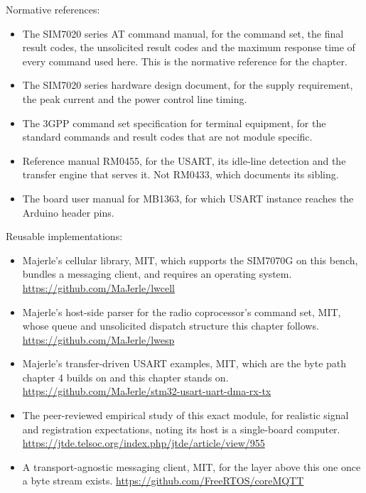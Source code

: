 Normative references:
\begin{itemize}
\item The SIM7020 series AT command manual, for the command set, the final
result codes, the unsolicited result codes and the maximum response time of
every command used here. This is the normative reference for the chapter.
\item The SIM7020 series hardware design document, for the supply requirement,
the peak current and the power control line timing.
\item The 3GPP command set specification for terminal equipment, for the
standard commands and result codes that are not module specific.
\item Reference manual RM0455, for the USART, its idle-line detection and the
transfer engine that serves it. Not RM0433, which documents its sibling.
\item The board user manual for MB1363, for which USART instance reaches the
Arduino header pins.
\end{itemize}

Reusable implementations:
\begin{itemize}
\item Majerle's cellular library, MIT, which supports the SIM7070G on this
bench, bundles a messaging client, and requires an operating system.\newline
\url{https://github.com/MaJerle/lwcell}
\item Majerle's host-side parser for the radio coprocessor's command set, MIT,
whose queue and unsolicited dispatch structure this chapter follows.\newline
\url{https://github.com/MaJerle/lwesp}
\item Majerle's transfer-driven USART examples, MIT, which are the byte path
chapter 4 builds on and this chapter stands on.\newline
\url{https://github.com/MaJerle/stm32-usart-uart-dma-rx-tx}
\item The peer-reviewed empirical study of this exact module, for realistic
signal and registration expectations, noting its host is a single-board
computer.\newline
\url{https://jtde.telsoc.org/index.php/jtde/article/view/955}
\item A transport-agnostic messaging client, MIT, for the layer above this one
once a byte stream exists.\newline
\url{https://github.com/FreeRTOS/coreMQTT}
\end{itemize}
